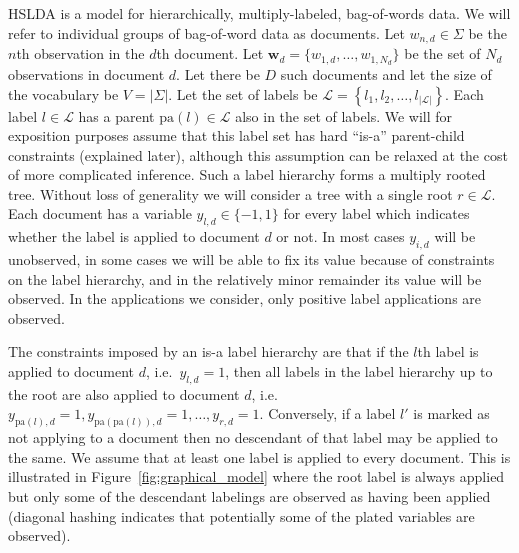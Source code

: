 
\label{sec:model} 

HSLDA is a model for hierarchically, multiply-labeled, bag-of-words data.  We will refer to individual groups of bag-of-word data as documents.  Let $w_{n,d} \in \Sigma$ be the $n$th observation in the $d$th document.  Let $\mathbf{w}_d = \{w_{1,d},\ldots,w_{1,N_d}\}$ be the  set of $N_d$ observations in document $d$.  Let there be $D$ such documents and let the size of the vocabulary be $V=|\Sigma|$.  Let the set of labels be $\mathcal{L}=\left\{ l_{1},l_{2},\ldots,l_{\left|\mathcal{L}\right|}\right\} $. Each label $l \in \mathcal{L}$ has a parent $\mathrm{pa}(l) \in \mathcal{L}$ also in the set of labels.
 We will for exposition purposes assume that this label set has hard ``is-a'' parent-child constraints (explained later), although this assumption can be relaxed at the cost of more complicated inference.  Such a label hierarchy forms a multiply rooted tree.  Without loss of generality we will consider a tree with a single root $r\in\mathcal{L}$.  Each document has a variable $y_{l,d} \in \{-1,1\}$ for every label which indicates whether the label is applied to document $d$ or not.   In most cases $y_{i,d}$ will be unobserved, in some cases we will be able to fix its value because of  constraints on the label hierarchy, and in the relatively minor remainder its value will be observed.  In the applications we consider, only positive label applications are observed.  
 
The constraints imposed by an is-a label hierarchy are that if the $l$th label is applied to document $d$, i.e.~$y_{l,d} = 1$, then all labels in the label hierarchy up to the root are also applied to document $d$, i.e.~$y_{\mathrm{pa}(l),d} = 1, y_{\mathrm{pa}(\mathrm{pa}(l)),d} = 1, \ldots, y_{r,d}=1.$  Conversely, if a label $l'$ is marked as not applying to a document then no descendant of that label may be applied to the same.   We assume that at least one label is applied to every document.  This is illustrated in Figure~\ref{fig:graphical_model} where the root label is always applied but only some of the descendant labelings are observed as having been applied (diagonal hashing indicates that potentially some of the plated variables are observed).


